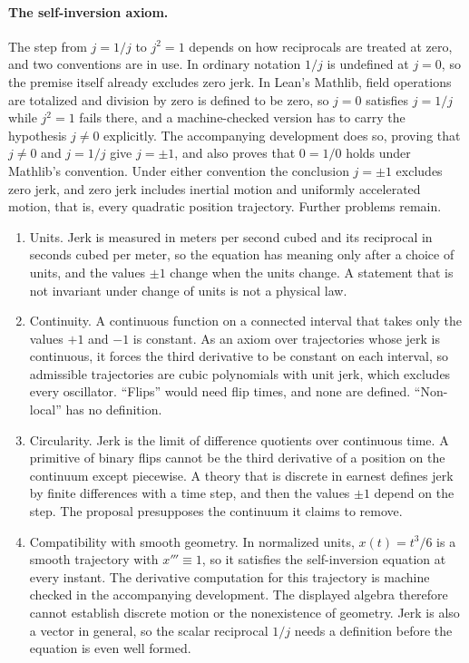 \documentclass[11pt]{article}
\begin{document}
\paragraph{The self-inversion axiom.} The step from $j=1/j$ to $j^2=1$ depends on how reciprocals are treated at zero, and two conventions are in use. In ordinary notation $1/j$ is undefined at $j=0$, so the premise itself already excludes zero jerk. In Lean's Mathlib, field operations are totalized and division by zero is defined to be zero, so $j=0$ satisfies $j=1/j$ while $j^2=1$ fails there, and a machine-checked version has to carry the hypothesis $j\neq0$ explicitly. The accompanying development does so, proving that $j\neq0$ and $j=1/j$ give $j=\pm1$, and also proves that $0=1/0$ holds under Mathlib's convention. Under either convention the conclusion $j=\pm1$ excludes zero jerk, and zero jerk includes inertial motion and uniformly accelerated motion, that is, every quadratic position trajectory. Further problems remain.
\begin{enumerate}[label=(\roman*), leftmargin=2.5em]
\item Units. Jerk is measured in meters per second cubed and its reciprocal in seconds cubed per meter, so the equation has meaning only after a choice of units, and the values $\pm1$ change when the units change. A statement that is not invariant under change of units is not a physical law.
\item Continuity. A continuous function on a connected interval that takes only the values $+1$ and $-1$ is constant. As an axiom over trajectories whose jerk is continuous, it forces the third derivative to be constant on each interval, so admissible trajectories are cubic polynomials with unit jerk, which excludes every oscillator. ``Flips'' would need flip times, and none are defined. ``Non-local'' has no definition.
\item Circularity. Jerk is the limit of difference quotients over continuous time. A primitive of binary flips cannot be the third derivative of a position on the continuum except piecewise. A theory that is discrete in earnest defines jerk by finite differences with a time step, and then the values $\pm1$ depend on the step. The proposal presupposes the continuum it claims to remove.
\item Compatibility with smooth geometry. In normalized units, $x(t)=t^3/6$ is a smooth trajectory with $x'''\equiv1$, so it satisfies the self-inversion equation at every instant. The derivative computation for this trajectory is machine checked in the accompanying development. The displayed algebra therefore cannot establish discrete motion or the nonexistence of geometry. Jerk is also a vector in general, so the scalar reciprocal $1/j$ needs a definition before the equation is even well formed.
\end{enumerate}
\end{document}
